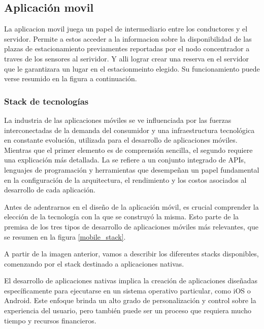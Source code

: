 \clearpage

\subsection{Aplicación movil}

La aplicacion movil juega un papel de intermediario entre los conductores y el servidor. Permite a estos acceder a la informacion sobre la disponibilidad de las plazas de estacionamiento previamentes reportadas por el nodo concentrador a traves de los sensores al serividor. Y alli lograr crear una reserva en el servidor que le garantizara un lugar en el estacionmeinto elegido. Su funcionamiento puede verse resumido en la figura a continuación.


\subsubsection{Stack de tecnologías}
La industria de las aplicaciones móviles se ve influenciada por las fuerzas interconectadas de la demanda del consumidor y una infraestructura tecnológica en constante evolución, utilizada para el desarrollo de aplicaciones móviles. Mientras que el primer elemento es de comprensión sencilla, el segundo requiere una explicación más detallada. La  se refiere a un conjunto integrado de APIs, lenguajes de programación y herramientas que desempeñan un papel fundamental en la configuración de la arquitectura, el rendimiento y los costos asociados al desarrollo de cada aplicación.

Antes de adentrarnos en el diseño de la aplicación móvil, es crucial comprender la elección de la tecnología con la que se construyó la misma. Esto parte de la premisa de los tres tipos de desarrollo de aplicaciones móviles más relevantes, que se resumen en la figura \ref{mobile_stack}.


A partir de la imagen anterior, vamos a describir los diferentes stacks disponibles, comenzando por el stack destinado a aplicaciones nativas.

El desarrollo de aplicaciones nativas implica la creación de aplicaciones diseñadas específicamente para ejecutarse en un sistema operativo particular, como iOS o Android. Este enfoque brinda un alto grado de personalización y control sobre la experiencia del usuario, pero también puede ser un proceso que requiera mucho tiempo y recursos financieros.


